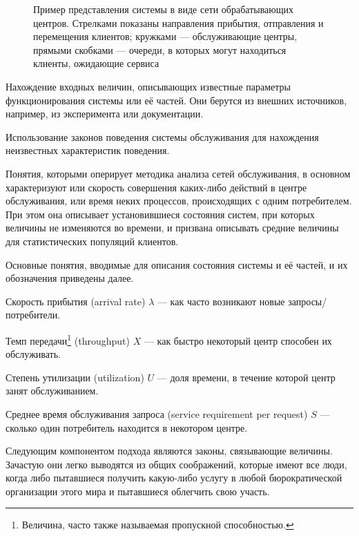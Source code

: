 \begin{enumerate*}
\begin{figure}[htb]
\begin{tikzpicture}[>=latex, node distance = 2cm, font=\small]
    \end{tikzpicture}
    \caption[Пример представления системы в виде сети обрабатывающих центров]{Пример представления системы в виде сети обрабатывающих центров. Стрелками показаны направления прибытия, отправления и перемещения клиентов; кружками — обслуживающие центры, прямыми скобками — очереди, в которых могут находиться клиенты, ожидающие сервиса}
    \label{fig:qsp}
\end{figure}


\item Нахождение входных величин, описывающих известные параметры функционирования системы или её частей. Они берутся из внешних источников, например, из эксперимента или документации.

\item Использование законов поведения системы обслуживания для нахождения неизвестных характеристик поведения.
\end{enumerate*}

Понятия, которыми оперирует методика анализа сетей обслуживания, в основном характеризуют или скорость совершения каких-либо действий в центре обслуживания, или время неких процессов, происходящих с одним потребителем. При этом она описывает установившиеся состояния систем, при которых величины не изменяются во времени, и призвана описывать средние величины для статистических популяций клиентов.

Основные понятия, вводимые для описания состояния системы и её частей, и их обозначения приведены далее.

\begin{itemize*}
\item 
Скорость прибытия (\abbr arrival rate) $\lambda$ — как часто возникают новые запросы/потребители.

\item 
Темп передачи\footnote{Величина, часто также называемая пропускной способностью.} (\abbr throughput) $X$ — как быстро некоторый центр способен их обслуживать.

\item 
Степень утилизации (\abbr utilization) $U$ — доля времени, в течение которой центр занят обслуживанием.

\item 
Среднее время обслуживания запроса (\abbr service requirement per request) $S$ — сколько один потребитель находится в некотором центре.
\end{itemize*}

Следующим компонентом подхода являются законы, связывающие величины. Зачастую  они легко выводятся из общих соображений, которые имеют все люди, когда либо пытавшиеся получить какую-либо услугу в любой бюрократической организации этого мира и пытавшиеся облегчить свою участь.

